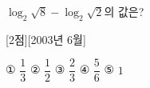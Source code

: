 $\log_{2}\sqrt{8}-\log_{2}\sqrt{2}$의 값은? 

[2점][2003년 6월]

① $\dfrac{1}{3}$
② $\dfrac{1}{2}$
③ $\dfrac{2}{3}$
④ $\dfrac{5}{6}$
⑤ $1$



\vfill{}
\rule{0pt}{1mm}